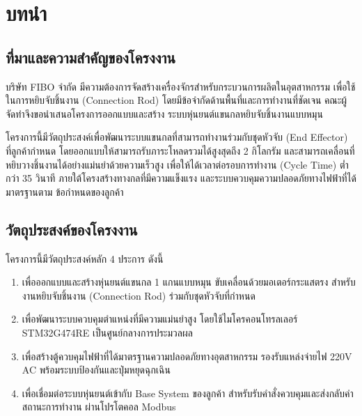 
\section{บทนำ}
\label{sec:introduction}

\subsection{ที่มาและความสำคัญของโครงงาน}
\label{subsec:project_background}

บริษัท FIBO จำกัด มีความต้องการจัดสร้างเครื่องจักรสำหรับกระบวนการผลิตในอุตสาหกรรม
เพื่อใช้ในการหยิบจับชิ้นงาน (Connection Rod) โดยมีข้อจำกัดด้านพื้นที่และการทำงานที่ชัดเจน
คณะผู้จัดทำจึงขอนำเสนอโครงการออกแบบและสร้าง ระบบหุ่นยนต์แขนกลหยิบจับชิ้นงานแบบหมุน

โครงการนี้มีวัตถุประสงค์เพื่อพัฒนาระบบแขนกลที่สามารถทำงานร่วมกับชุดหัวจับ
(End Effector) ที่ลูกค้ากำหนด โดยออกแบบให้สามารถรับภาระโหลดรวมได้สูงสุดถึง 2 กิโลกรัม
และสามารถเคลื่อนที่หยิบวางชิ้นงานได้อย่างแม่นยำด้วยความเร็วสูง
เพื่อให้ได้เวลาต่อรอบการทำงาน (Cycle Time) ต่ำกว่า 35 วินาที
ภายใต้โครงสร้างทางกลที่มีความแข็งแรง และระบบควบคุมความปลอดภัยทางไฟฟ้าที่ได้มาตรฐานตาม
ข้อกำหนดของลูกค้า

\subsection{วัตถุประสงค์ของโครงงาน}
\label{subsec:project_objectives}

โครงการนี้มีวัตถุประสงค์หลัก 4 ประการ ดังนี้

\begin{enumerate}
  \item เพื่อออกแบบและสร้างหุ่นยนต์แขนกล 1 แกนแบบหมุน ขับเคลื่อนด้วยมอเตอร์กระแสตรง
        สำหรับงานหยิบจับชิ้นงาน (Connection Rod) ร่วมกับชุดหัวจับที่กำหนด

  \item เพื่อพัฒนาระบบควบคุมตำแหน่งที่มีความแม่นยำสูง
        โดยใช้ไมโครคอนโทรลเลอร์ STM32G474RE เป็นศูนย์กลางการประมวลผล

  \item เพื่อสร้างตู้ควบคุมไฟฟ้าที่ได้มาตรฐานความปลอดภัยทางอุตสาหกรรม
        รองรับแหล่งจ่ายไฟ 220V AC พร้อมระบบป้องกันและปุ่มหยุดฉุกเฉิน

  \item เพื่อเชื่อมต่อระบบหุ่นยนต์เข้ากับ Base System ของลูกค้า
        สำหรับรับคำสั่งควบคุมและส่งกลับค่าสถานะการทำงาน
        ผ่านโปรโตคอล Modbus
\end{enumerate}

